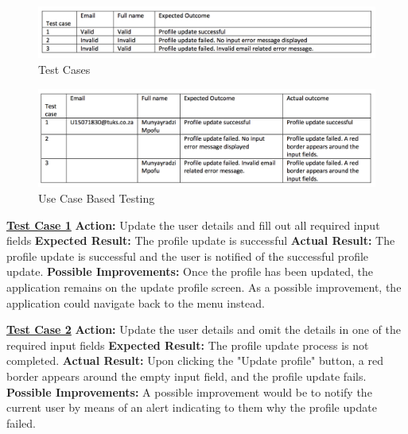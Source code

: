 \documentclass[english]{article}
\begin{document}
\begin{figure}[H]
\centering
\includegraphics[width=1.0\textwidth]{editprofile_test_cases}
\caption{Test Cases}
\end{figure}

\begin{figure}[H]
\centering
\includegraphics[width=1.0\textwidth]{use_case_based_testing_editprofile}
\caption{Use Case Based Testing}
\end{figure}

\textbf{\underline{Test Case 1}}\newline
\textbf{Action:} Update the user details and fill out all required input fields\newline
\textbf{Expected Result:} The profile update is successful\newline
\textbf{Actual Result:} The profile update is successful and the user is notified of the successful profile update.\newline
\textbf{Possible Improvements:} Once the profile has been updated, the application remains on the update profile screen. As a possible improvement, the application could navigate back to the menu instead.\newline

\textbf{\underline{Test Case 2}}\newline
\textbf{Action:} Update the user details and omit the details in one of the required input fields\newline
\textbf{Expected Result:} The profile update process is not completed.\newline
\textbf{Actual Result:} Upon clicking the "Update profile" button, a red border appears around the empty input field, and the profile update fails.\newline
\textbf{Possible Improvements:} A possible improvement would be to notify the current user by means of an alert indicating to them why the profile update failed.\newline
\end{document}
